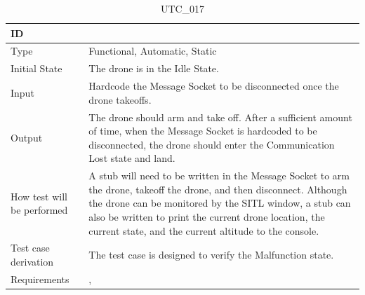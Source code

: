 \documentclass[12pt, titlepage]{article}
\begin{document}
\begin{table}[!h]
\begin{center}
\caption {UTC\_017}
\label{tab:UTC_017}
\begin{tabular}{ | m{3.2cm} | m{12.2cm} | } 
\hline
ID & \nameref{tab:UTC_017} \\ 
\hline
Type &  Functional, Automatic, Static  \\ 
\hline
Initial State & The drone is in the Idle State. \\ 
\hline
Input &  Hardcode the Message Socket to be disconnected once the drone takeoffs. \\ 
\hline
Output &  The drone should arm and take off. After a sufficient amount of time, when the Message Socket is hardcoded to be disconnected, the drone should enter the Communication Lost state and land.\\  
\hline
How test will be performed & A stub will need to be written in the Message Socket to arm the drone, takeoff the drone, and then disconnect. Although the drone can be monitored by the SITL window, a stub can also be written to print the current drone location, the current state, and the current altitude to the console.\\ 
\hline
Test case derivation &  The test case is designed to verify the Malfunction state. \\ 
\hline
Requirements & \nameref{STA_010}, \nameref{TRANS_010} \\ 
\hline
\end{tabular}
\end{center}
\end{table}
\end{document}

